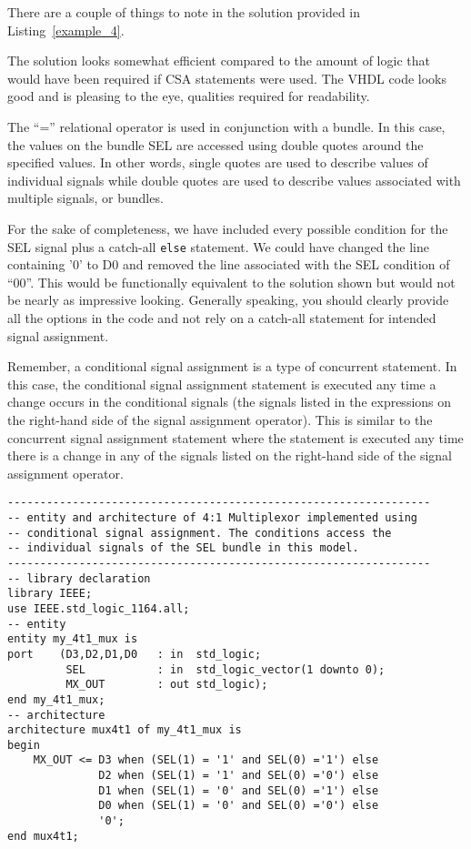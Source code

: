 There are a couple of things to note in the solution provided in Listing~\ref{example_4}.
\begin{my_list}
\item The solution looks somewhat efficient compared to the amount of logic that would have been required if CSA statements were used. The VHDL code looks good and is pleasing to the eye, qualities required for readability.
\item The ``='' relational operator is used in conjunction with a bundle. In this case, the values on the bundle SEL are accessed using double quotes around the specified values. In other words, single quotes are used to describe values of individual signals while double quotes are used to describe values associated with multiple signals, or bundles.
\item For the sake of completeness, we have included every possible condition for the SEL signal plus a catch-all \texttt{else} statement. We could have changed the line containing '0' to D0 and removed the line associated with the SEL condition of ``00''. This would be functionally equivalent to the solution shown but would not be nearly as impressive looking. Generally speaking, you should clearly provide all the options in the code and not rely on a catch-all statement for intended signal assignment.
\end{my_list}
Remember, a conditional signal assignment is a type of concurrent statement. In this case, the conditional signal assignment statement is executed any time a change occurs in the conditional signals (the signals listed in the expressions on the right-hand side of the signal assignment operator). This is similar to the concurrent signal assignment statement where the statement is executed any time there is a change in any of the signals listed on the right-hand side of the signal assignment operator.

\begin{lstlisting}[float, label=example_4_bis, caption=Alternative solution to Example~4 accessing individual signals.]
-----------------------------------------------------------------
-- entity and architecture of 4:1 Multiplexor implemented using
-- conditional signal assignment. The conditions access the
-- individual signals of the SEL bundle in this model.
-----------------------------------------------------------------
-- library declaration
library IEEE;
use IEEE.std_logic_1164.all;
-- entity
entity my_4t1_mux is
port	(D3,D2,D1,D0   : in  std_logic;
         SEL           : in  std_logic_vector(1 downto 0);
         MX_OUT        : out std_logic);
end my_4t1_mux;
-- architecture
architecture mux4t1 of my_4t1_mux is
begin
	MX_OUT <= D3 when (SEL(1) = '1' and SEL(0) ='1') else
	          D2 when (SEL(1) = '1' and SEL(0) ='0') else
	          D1 when (SEL(1) = '0' and SEL(0) ='1') else
	          D0 when (SEL(1) = '0' and SEL(0) ='0') else
	          '0';
end mux4t1;
\end{lstlisting}

